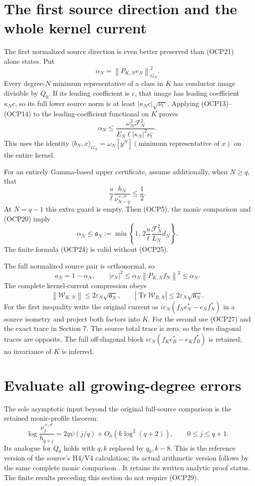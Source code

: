 \documentclass[11pt]{article}
\newcommand{\tr}{\operatorname{Tr}}
\newcommand{\eps}{\varepsilon}
\newcommand{\norm}[1]{\left\lVert#1\right\rVert}
\begin{document}
\section[The first source direction and the kernel current]{The first source direction and the whole kernel current}
The first normalized source direction is even better preserved than (OCP21) alone states. Put
\[
 \alpha_N=\norm{P_{K,N}e_N}_{G_N}^2.
\]
Every degree-$N$ minimum representative of a class in $K$ has conductor image divisible by $Q_0$. If its leading coefficient is $c$, that image has leading coefficient $\kappa_Nc$, so its full lower source norm is at least $|\kappa_Nc|\sqrt{\nu_t^-}$. Applying (OCP13)--(OCP14) to the leading-coefficient functional on $K$ proves
\[
 \boxed{\alpha_N\le
 \frac{\omega_N^2\mathcal F_N^2}
 {E_N\ell|\kappa_N|^2\nu_t^-}.}
 \tag{OCP24}
\]
This uses the identity $\langle b_N,x\rangle_{G_N}=\omega_N[y^N](\text{minimum representative of }x)$ on the entire kernel.

For an entirely Gamma-based upper certificate, assume additionally, when $N\ge q$, that
\[
 \frac u\ell\frac{h_N}{\nu_{N-q}^{+,\sigma}}\le\frac12.
 \tag{OCP25}
\]
At $N=q-1$ this extra guard is empty. Then (OCP5), the monic comparison and (OCP20) imply
\[
 \boxed{\alpha_N\le\mathfrak a_N:=
 \min\left\{1,\,2\frac u\ell\frac{\mathcal F_N^2}{L_N}d_N\right\}.}
 \tag{OCP26}
\]
The finite formula (OCP24) is valid without (OCP25).

The full normalized source pair is orthonormal, so
\[
 a_N=1-\alpha_N,\qquad
 |r_N|^2\le\alpha_N\norm{P_{K,N}f_N}^2\le\alpha_N.
 \tag{OCP27}
\]
The complete kernel-current compression obeys
\[
 \boxed{\norm{\mathscr W_{K,N}}\le2\eps_N\sqrt{\mathfrak a_N},\qquad
 |\tr\mathscr W_{B,N}|\le2\eps_N\sqrt{\mathfrak a_N}.}
 \tag{OCP28}
\]
For the first inequality write the original current as
$i\eps_N(f_Ne_N^*-e_Nf_N^*)$ in a source isometry and project both factors into $K$. For the second use (OCP27) and the exact trace in Section 7. The source total trace is zero, so the two diagonal traces are opposite. The full off-diagonal block $i\eps_N(f_Ke_B^*-e_Kf_B^*)$ is retained; no invariance of $K$ is inferred.

\section{Evaluate all growing-degree errors}
The sole asymptotic input beyond the original full-source comparison is the retained monic-profile theorem:
\[
 \log\frac{\nu_j^{+,\sigma}}{h_{q+j}}
 =2q\psi(j/q)+O_h(k\log^2(q+2)),\qquad0\le j\le q+1.
 \tag{OCP29}
\]
Its analogue for $Q_0$ holds with $q,k$ replaced by $q_0,k-8$. This is the reference version of the source's H4/V4 calculation; its actual arithmetic version follows by the same complete monic comparison \cite{heat,lrc}. It retains its written analytic proof status. The finite results preceding this section do not require (OCP29).
\end{document}
